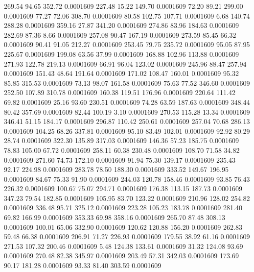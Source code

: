  269.54   94.65  352.72   0.0001609
 227.48   15.22  149.70   0.0001609
  72.20   89.21  299.00   0.0001609
  77.27   72.06  308.70   0.0001609
  80.58  102.75  107.71   0.0001609
   6.68  140.74  288.28   0.0001609
 359.16   27.87  341.20   0.0001609
 274.86   83.96  184.63   0.0001609
 282.69   87.36    8.66   0.0001609
 257.08   90.47  167.19   0.0001609
 273.59   85.45   66.32   0.0001609
  90.41   91.05  212.27   0.0001609
 253.45   79.75  235.72   0.0001609
  95.05   87.95  225.67   0.0001609
 199.08   63.56   37.99   0.0001609
 168.88  102.96  113.88   0.0001609
 271.93  122.78  219.13   0.0001609
  66.91   96.04  123.02   0.0001609
 245.96   88.47  257.94   0.0001609
 151.43   48.64  191.64   0.0001609
 171.02  108.47  160.01   0.0001609
  95.32   85.85  315.53   0.0001609
  73.13   98.07  161.58   0.0001609
  75.63   77.52  346.60   0.0001609
 252.50  107.89  310.78   0.0001609
 160.38  119.51  176.96   0.0001609
 220.64  111.42   69.82   0.0001609
  25.16   93.60  230.51   0.0001609
  74.28   63.59  187.63   0.0001609
 348.44   80.42  357.69   0.0001609
  82.44  100.19    3.10   0.0001609
 270.53  115.28   13.34   0.0001609
 346.41   51.15  184.17   0.0001609
 296.87  110.42  250.61   0.0001609
 257.04   70.68  286.13   0.0001609
 104.25   68.26  337.81   0.0001609
  95.10   83.49  102.01   0.0001609
  92.92   80.29   28.74   0.0001609
 322.30  135.89  317.03   0.0001609
 146.36   57.23  185.75   0.0001609
  78.83  105.00   67.72   0.0001609
 258.11   60.38  230.48   0.0001609
 108.70   71.58   34.82   0.0001609
 271.60   74.73  172.10   0.0001609
  91.94   75.30  139.17   0.0001609
 235.43   92.17  224.98   0.0001609
 283.78   78.50  188.30   0.0001609
 333.52  149.67  196.95   0.0001609
  84.67   75.33   91.90   0.0001609
 244.03  120.78  158.46   0.0001609
  93.85   76.43  226.32   0.0001609
 100.67   75.07  294.71   0.0001609
 176.38  113.15  187.73   0.0001609
 347.23   79.54  182.85   0.0001609
 105.95   83.70  123.22   0.0001609
 210.96  128.02  254.82   0.0001609
 336.48   95.71  325.12   0.0001609
 223.28  105.23  183.78   0.0001609
 281.40   69.82  166.99   0.0001609
 353.33   69.98  358.16   0.0001609
 265.70   87.48  308.13   0.0001609
 100.01   65.06  332.90   0.0001609
 120.62  120.88  156.20   0.0001609
 262.83   59.48   66.38   0.0001609
 206.91   71.27  226.93   0.0001609
 179.55   38.92   61.16   0.0001609
 271.53  107.32  200.46   0.0001609
   5.48  124.38  133.61   0.0001609
  31.32  124.08   93.69   0.0001609
 270.48   82.38  345.97   0.0001609
 203.49   57.31  342.03   0.0001609
 173.69   90.17  181.28   0.0001609
  93.33   81.40  303.59   0.0001609
